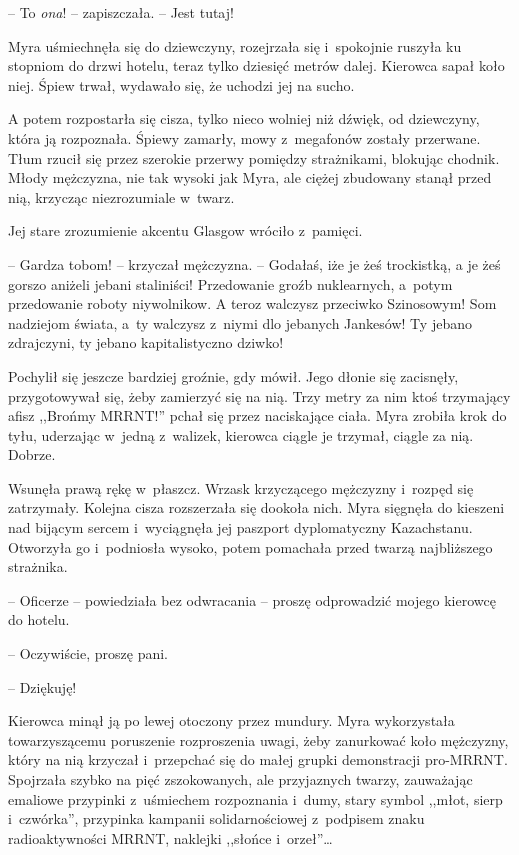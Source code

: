\documentclass[oneside,polish,11pt,sfheadings]{mwbk}
\begin{document}
-- To \textit{ona}! -- zapiszczała. -- Jest tutaj!

Myra uśmiechnęła się do dziewczyny, rozejrzała się i~spokojnie ruszyła
ku stopniom do drzwi hotelu, teraz tylko dziesięć metrów dalej. Kierowca
sapał koło niej. Śpiew trwał, wydawało się, że uchodzi jej na sucho.

A potem rozpostarła się cisza, tylko nieco wolniej niż dźwięk, od
dziewczyny, która ją rozpoznała. Śpiewy zamarły, mowy z~megafonów
zostały przerwane. Tłum rzucił się przez szerokie przerwy pomiędzy
strażnikami, blokując chodnik. Młody mężczyzna, nie tak wysoki jak Myra,
ale ciężej zbudowany stanął przed nią, krzycząc niezrozumiale w~twarz.

Jej stare zrozumienie akcentu Glasgow wróciło z~pamięci.

-- Gardza tobom! -- krzyczał mężczyzna. -- Godałaś, iże je żeś trockistką,
a je żeś gorszo aniżeli jebani staliniści! Przedowanie groźb
nuklearnych, a~potym przedowanie roboty niywolnikow. A teroz walczysz
przeciwko Szinosowym! Som nadziejom świata, a~ty walczysz z~niymi dlo
jebanych Jankesów! Ty jebano zdrajczyni, ty jebano kapitalistyczno
dziwko!

Pochylił się jeszcze bardziej groźnie, gdy mówił. Jego dłonie się
zacisnęły, przygotowywał się, żeby zamierzyć się na nią. Trzy metry za
nim ktoś trzymający afisz ,,Brońmy MRRNT!'' pchał się przez naciskające
ciała. Myra zrobiła krok do tyłu, uderzając w~jedną z~walizek, kierowca
ciągle je trzymał, ciągle za nią. Dobrze.

Wsunęła prawą rękę w~płaszcz. Wrzask krzyczącego mężczyzny i~rozpęd się
zatrzymały. Kolejna cisza rozszerzała się dookoła nich. Myra sięgnęła do
kieszeni nad bijącym sercem i~wyciągnęła jej paszport dyplomatyczny
Kazachstanu. Otworzyła go i~podniosła wysoko, potem pomachała przed
twarzą najbliższego strażnika.

-- Oficerze -- powiedziała bez odwracania -- proszę odprowadzić mojego
kierowcę do hotelu.

-- Oczywiście, proszę pani.

-- Dziękuję!

Kierowca minął ją po lewej otoczony przez mundury. Myra wykorzystała
towarzyszącemu poruszenie rozproszenia uwagi, żeby zanurkować koło
mężczyzny, który na nią krzyczał i~przepchać się do małej grupki
demonstracji pro-MRRNT. Spojrzała szybko na pięć zszokowanych, ale
przyjaznych twarzy, zauważając emaliowe przypinki z~uśmiechem
rozpoznania i~dumy, stary symbol ,,młot, sierp i~czwórka'', przypinka
kampanii solidarnościowej z~podpisem znaku radioaktywności MRRNT,
naklejki ,,słońce i~orzeł''\ldots
\end{document}
